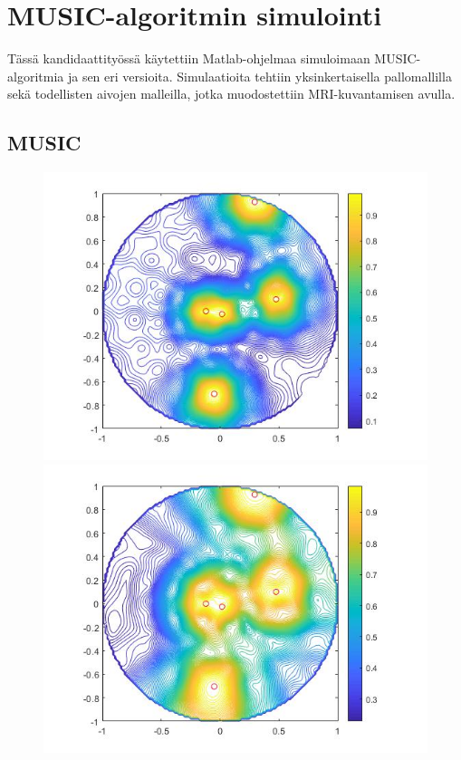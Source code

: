 \section{MUSIC-algoritmin simulointi}
Tässä kandidaattityössä käytettiin Matlab-ohjelmaa simuloimaan MUSIC-algoritmia ja sen eri versioita. Simulaatioita tehtiin yksinkertaisella pallomallilla sekä todellisten aivojen malleilla, jotka muodostettiin MRI-kuvantamisen avulla.



\subsection{MUSIC}
\begin{figure}[h]
    \centering
    \begin{minipage}{0.45\textwidth}
        \centering
        \includegraphics[width=1\textwidth]{MUSICfix.jpg}
    \end{minipage}\hfill
    \begin{minipage}{0.45\textwidth}
        \centering
        \includegraphics[width=1\textwidth]{MUSICfree.jpg} 

\end{minipage}
\end{figure}
